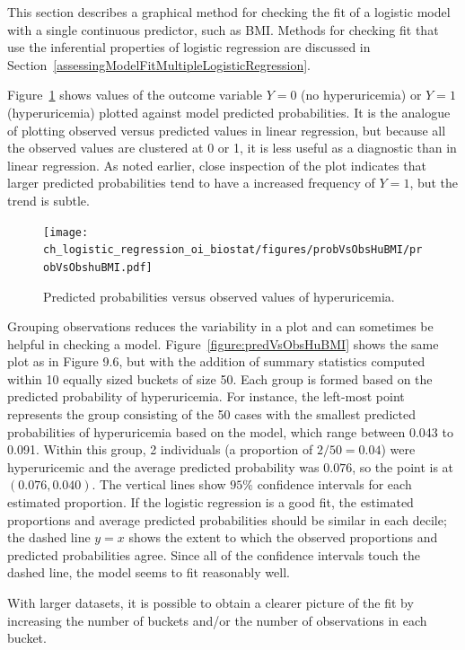This section describes a graphical method for checking the fit of a logistic model with a single continuous predictor, such as BMI. Methods for checking fit that use the inferential properties of logistic regression are discussed in Section~\ref{assessingModelFitMultipleLogisticRegression}.

Figure~\ref{figure:probVsObsHuBMI} shows values of the outcome variable $Y = 0$ (no hyperuricemia) or $Y = 1$ (hyperuricemia) plotted against model predicted probabilities. It is the analogue of plotting observed versus predicted values in linear regression, but because all the observed values are clustered at 0 or 1, it is less useful as a diagnostic than in linear regression.  As noted earlier, close inspection of the plot indicates that larger predicted probabilities tend to have a increased frequency of $Y = 1$, but the trend is subtle.

\begin{figure}[!tbh]
  \centering
  \texttt{[image: ch\_logistic\_regression\_oi\_biostat/figures/probVsObsHuBMI/probVsObshuBMI.pdf]}
    \caption{Predicted probabilities versus observed values of hyperuricemia. }
    \label{figure:probVsObsHuBMI}
\end{figure}

Grouping observations reduces the variability in a plot and can sometimes be helpful in checking a model. Figure~\ref{figure:predVsObsHuBMI} shows the same plot as in Figure 9.6, but with the addition of summary statistics computed within 10 equally sized buckets of size 50.  Each group is formed based on the predicted probability of hyperuricemia. For instance, the left-most point represents the group consisting of the 50 cases with the smallest predicted probabilities of hyperuricemia based on the model, which range between 0.043 to 0.091. Within this group, 2 individuals (a proportion of $2/50 = 0.04$) were hyperuricemic and the average predicted probability was $0.076$, so the point is at $(0.076, 0.040)$.  The vertical lines show $95\%$ confidence intervals for each estimated proportion.  If the logistic regression is a good fit, the estimated proportions and average predicted probabilities should be similar in each decile; the dashed line $y = x$ shows the extent to which the observed proportions and predicted probabilities agree.  Since all of  the confidence intervals touch the dashed line, the model seems to fit reasonably well.

With larger datasets, it is possible to obtain a clearer picture of the fit by increasing the number of buckets and/or the number of observations in each bucket. 


